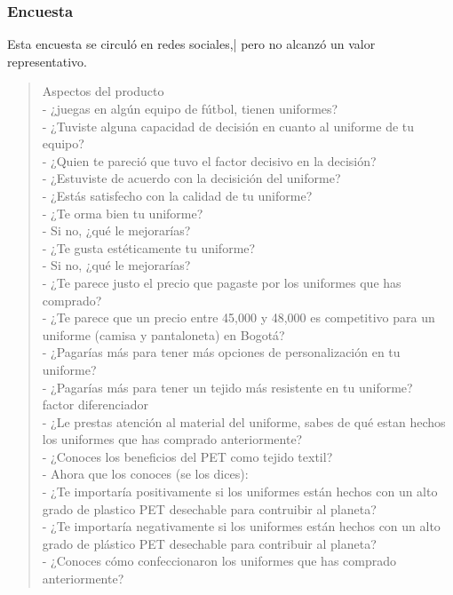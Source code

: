 \documentclass[11pt]{article}
\begin{document}
\subsubsection{Encuesta}
\label{sec:orgf4cb41c}
Esta encuesta se circuló en redes sociales,|
pero no alcanzó un valor representativo.

\begin{verse}
Aspectos del producto\\
- ¿juegas en algún equipo de fútbol, tienen uniformes?\\
- ¿Tuviste alguna capacidad de decisión en cuanto al uniforme de tu equipo?\\
- ¿Quien te pareció que tuvo el factor decisivo en la decisión?\\
- ¿Estuviste de acuerdo con la decisición del uniforme?\\
- ¿Estás satisfecho con la calidad de tu uniforme?\\
- ¿Te orma bien tu uniforme?\\
- Si no, ¿qué le mejorarías?\\
- ¿Te gusta estéticamente tu uniforme?\\
- Si no, ¿qué le mejorarías?\\
- ¿Te parece justo el precio que pagaste por los uniformes que has comprado?\\
- ¿Te parece que un precio entre  45,000 y 48,000  es competitivo para un uniforme (camisa y pantaloneta) en Bogotá?\\
- ¿Pagarías más para tener más opciones de personalización en tu uniforme?\\
- ¿Pagarías más para tener un tejido más resistente en tu uniforme?\\
\vspace*{1em}
factor diferenciador\\
- ¿Le prestas atención al material del uniforme, sabes de qué estan hechos los uniformes que has comprado anteriormente?\\
- ¿Conoces los beneficios del PET como tejido textil?\\
- Ahora que los conoces (se los dices):\\
- ¿Te importaría positivamente si los uniformes están hechos con un alto grado de plastico PET desechable para contruibir al planeta?\\
- ¿Te importaría negativamente si los uniformes están hechos con un alto grado de plástico PET desechable para contribuir al planeta?\\
- ¿Conoces cómo confeccionaron los uniformes que has comprado anteriormente?\\

\end{verse}
\end{document}
